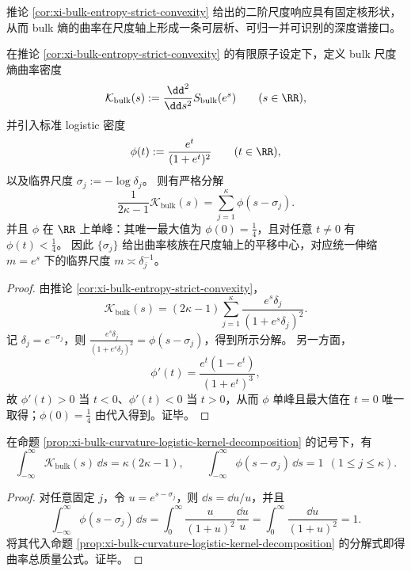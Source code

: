 
推论 \ref{cor:xi-bulk-entropy-strict-convexity} 给出的二阶尺度响应具有固定核形状，从而 bulk 熵的曲率在尺度轴上形成一条可层析、可归一并可识别的深度谱接口。

\begin{proposition}[尺度熵曲率的 logistic 核分解：临界尺度 \texorpdfstring{$\sigma_j=-\log\delta_j$}{sigma_j=-log delta_j}]\label{prop:xi-bulk-curvature-logistic-kernel-decomposition}
在推论 \ref{cor:xi-bulk-entropy-strict-convexity} 的有限原子设定下，定义 bulk 尺度熵曲率密度
\[
\mathcal{K}_{\mathrm{bulk}}(s):=\frac{\dd^{2}}{\dd s^{2}}S_{\mathrm{bulk}}(e^{s})\qquad(s\in\RR),
\]
并引入标准 logistic 密度
\[
\phi(t):=\frac{e^{t}}{(1+e^{t})^{2}}\qquad(t\in\RR),
\]
以及临界尺度 \(\sigma_j:=-\log\delta_j\)。
则有严格分解
\[
\boxed{\;
\frac{1}{2\kappa-1}\mathcal{K}_{\mathrm{bulk}}(s)=\sum_{j=1}^{\kappa}\phi(s-\sigma_j).\;}
\]
并且 \(\phi\) 在 \(\RR\) 上单峰：其唯一最大值为 \(\phi(0)=\tfrac14\)，且对任意 \(t\neq 0\) 有 \(\phi(t)<\tfrac14\)。
因此 \(\{\sigma_j\}\) 给出曲率核族在尺度轴上的平移中心，对应统一伸缩 \(m=e^s\) 下的临界尺度 \(m\asymp \delta_j^{-1}\)。
\end{proposition}
\begin{proof}
由推论 \ref{cor:xi-bulk-entropy-strict-convexity}，
\[
\mathcal{K}_{\mathrm{bulk}}(s)
=(2\kappa-1)\sum_{j=1}^{\kappa}\frac{e^{s}\delta_j}{(1+e^{s}\delta_j)^{2}}.
\]
记 \(\delta_j=e^{-\sigma_j}\)，则 \(\frac{e^{s}\delta_j}{(1+e^{s}\delta_j)^{2}}=\phi(s-\sigma_j)\)，得到所示分解。
另一方面，
\[
\phi'(t)=\frac{e^{t}(1-e^{t})}{(1+e^{t})^{3}},
\]
故 \(\phi'(t)>0\) 当 \(t<0\)、\(\phi'(t)<0\) 当 \(t>0\)，从而 \(\phi\) 单峰且最大值在 \(t=0\) 唯一取得；\(\phi(0)=\tfrac14\) 由代入得到。证毕。
\end{proof}

\begin{corollary}[熵曲率的总质量量子化：\texorpdfstring{$\int\mathcal{K}_{\mathrm{bulk}}=\kappa(2\kappa-1)$}{int K_bulk = k(2k-1)}]\label{cor:xi-bulk-curvature-mass-quantization}
在命题 \ref{prop:xi-bulk-curvature-logistic-kernel-decomposition} 的记号下，有
\[
\boxed{\;
\int_{-\infty}^{\infty}\mathcal{K}_{\mathrm{bulk}}(s)\,\dd s=\kappa(2\kappa-1),
\qquad
\int_{-\infty}^{\infty}\phi(s-\sigma_j)\,\dd s=1\ \ (1\le j\le\kappa).\;}
\]
\end{corollary}
\begin{proof}
对任意固定 \(j\)，令 \(u=e^{s-\sigma_j}\)，则 \(\dd s=\dd u/u\)，并且
\[
\int_{-\infty}^{\infty}\phi(s-\sigma_j)\,\dd s
=\int_{0}^{\infty}\frac{u}{(1+u)^2}\frac{\dd u}{u}
=\int_{0}^{\infty}\frac{\dd u}{(1+u)^2}
=1.
\]
将其代入命题 \ref{prop:xi-bulk-curvature-logistic-kernel-decomposition} 的分解式即得曲率总质量公式。证毕。
\end{proof}

